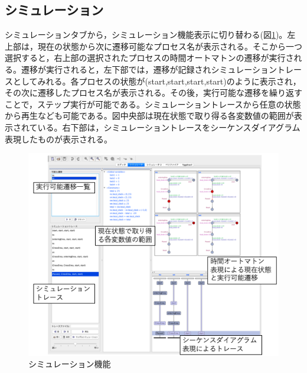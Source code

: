 \documentclass{tpu-sotu}
\begin{document}
	\subsection{シミュレーション}
	シミュレーションタブから，シミュレーション機能表示に切り替わる(図\ref{ESR})。左上部は，現在の状態から次に遷移可能なプロセス名が表示される。そこから一つ選択すると，右上部の選択されたプロセスの時間オートマトンの遷移が実行される。遷移が実行されると，左下部では，遷移が記録されシミュレーショントレースとしてみれる。各プロセスの状態が(start,start,start,start)のように表示され，その次に遷移したプロセス名が表示される。その後，実行可能な遷移を繰り返すことで，ステップ実行が可能である。シミュレーショントレースから任意の状態から再生なども可能である。図中央部は現在状態で取り得る各変数値の範囲が表示されている。右下部は，シミュレーショントレースをシーケンスダイアグラム表現したものが表示される。
	\begin{figure}[htbp]
	\centering
	\includegraphics[width=140mm]{ExmpleSimulationResult.png}
	\caption{シミュレーション機能}
	\label{ESR}   
	\end{figure}
	
\end{document}
